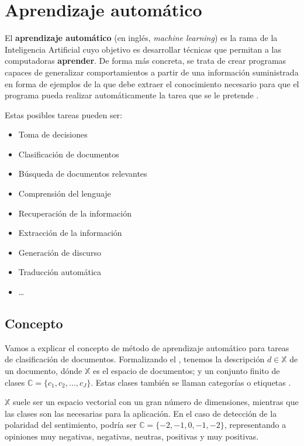 
\chapter{Aprendizaje automático}

El \textbf{aprendizaje automático} (en inglés, \emph{machine learning}) es la rama de la Inteligencia Artificial cuyo objetivo es desarrollar técnicas que permitan a las computadoras \textbf{aprender}. De forma más concreta, se trata de crear programas capaces de generalizar comportamientos a partir de una información suministrada en forma de ejemplos de la que debe extraer el conocimiento necesario para que el programa pueda realizar automáticamente la tarea que se le pretende \citep[Aprendizaje automático]{wikipedia-es}.

Estas posibles tareas pueden ser: \citep{MartinMateos2013} 
\begin{itemize}
\item Toma de decisiones
\item Clasificación de documentos
\item Búsqueda de documentos relevantes
\item Comprensión del lenguaje
\item Recuperación de la información
\item Extracción de la información
\item Generación de discurso
\item Traducción automática
\item \ldots
\end{itemize}

\section{Concepto}

Vamos a explicar el concepto de método de aprendizaje automático para tareas de clasificación de documentos.
Formalizando el , tenemos la descripción $d\in \mathbb{X}$ de un documento, dónde $\mathbb{X}$ es el espacio de documentos; y un conjunto finito de clases $\mathbb{C} = \{c_1, c_2, \ldots, c_J\}$. Estas clases también se llaman categorías o etiquetas \citep{Manning2008}.

$\mathbb{X}$ suele ser un espacio vectorial con un gran número de dimensiones, mientras que las clases son las necesarias para la aplicación. En el caso de detección de la polaridad del sentimiento, podría ser $\mathbb{C}=\{-2,-1,0,-1,-2\}$, representando a opiniones muy negativas, negativas, neutras, positivas y muy positivas.

